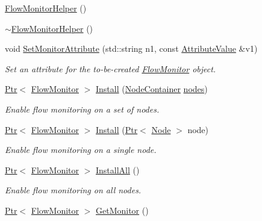 \begin{DoxyCompactItemize}
\item 
\hyperlink{classns3_1_1FlowMonitorHelper_adef809947f5f010d718a73b898e4246e}{Flow\+Monitor\+Helper} ()
\item 
\hyperlink{classns3_1_1FlowMonitorHelper_ab7ac2c23a49ee10c6e76f3bc344fe90a}{$\sim$\+Flow\+Monitor\+Helper} ()
\item 
void \hyperlink{classns3_1_1FlowMonitorHelper_a6550b7bbb53413bfa09d0dd0f700305e}{Set\+Monitor\+Attribute} (std\+::string n1, const \hyperlink{classns3_1_1AttributeValue}{Attribute\+Value} \&v1)
\begin{DoxyCompactList}\small\item\em Set an attribute for the to-\/be-\/created \hyperlink{classns3_1_1FlowMonitor}{Flow\+Monitor} object. \end{DoxyCompactList}\item 
\hyperlink{classns3_1_1Ptr}{Ptr}$<$ \hyperlink{classns3_1_1FlowMonitor}{Flow\+Monitor} $>$ \hyperlink{classns3_1_1FlowMonitorHelper_abffcd31f85872c6b736f30e9d300390d}{Install} (\hyperlink{classns3_1_1NodeContainer}{Node\+Container} \hyperlink{visualizer-ideas_8txt_a3e1b3808014a2c68ab0cd0182e041be2}{nodes})
\begin{DoxyCompactList}\small\item\em Enable flow monitoring on a set of nodes. \end{DoxyCompactList}\item 
\hyperlink{classns3_1_1Ptr}{Ptr}$<$ \hyperlink{classns3_1_1FlowMonitor}{Flow\+Monitor} $>$ \hyperlink{classns3_1_1FlowMonitorHelper_ae07a9261fad2a9b941be785be4977f0b}{Install} (\hyperlink{classns3_1_1Ptr}{Ptr}$<$ \hyperlink{classns3_1_1Node}{Node} $>$ node)
\begin{DoxyCompactList}\small\item\em Enable flow monitoring on a single node. \end{DoxyCompactList}\item 
\hyperlink{classns3_1_1Ptr}{Ptr}$<$ \hyperlink{classns3_1_1FlowMonitor}{Flow\+Monitor} $>$ \hyperlink{classns3_1_1FlowMonitorHelper_a722b383a10c5a959576f3bfee8d4374f}{Install\+All} ()
\begin{DoxyCompactList}\small\item\em Enable flow monitoring on all nodes. \end{DoxyCompactList}\item 
\hyperlink{classns3_1_1Ptr}{Ptr}$<$ \hyperlink{classns3_1_1FlowMonitor}{Flow\+Monitor} $>$ \hyperlink{classns3_1_1FlowMonitorHelper_aa250a2bd2fe270cd743caf1cce482a86}{Get\+Monitor} ()

\end{DoxyCompactItemize}
